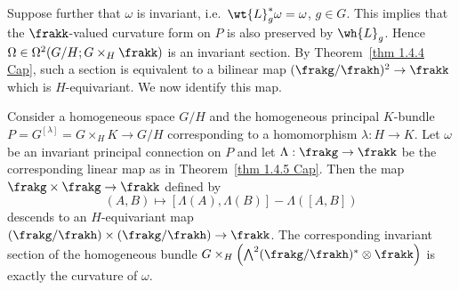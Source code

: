 Suppose further that $\omega$ is invariant, i.e.\ $\wt{L}_g^\ast \omega=\omega$, $g\in G$. This implies that the $\frakk$-valued curvature form on $P$ is also preserved by $\wh{L}_g$. Hence $\Omega\in\Omega^2(G\slash H;G\times_H \frakk)$ is an invariant section. By Theorem~\ref{thm 1.4.4 Cap}, such a section is equivalent to a bilinear map $(\frakg\slash\frakh)^2\to\frakk$ which is $H$-equivariant. We now identify this map.
\begin{prop}\label{prop 1.4.6 Cap}
    Consider a homogeneous space $G\slash H$ and the homogeneous principal $K$-bundle $P=G^{[\lambda]}=G\times_H K\to G\slash H$ corresponding to a homomorphism $\lambda:H\to K$. Let $\omega$ be an invariant principal connection on $P$ and let $\Lambda:\frakg\to \frakk$ be the corresponding linear map as in Theorem~\ref{thm 1.4.5 Cap}. Then the map $\frakg\times\frakg\to\frakk$ defined by 
    \[(A,B)\mapsto [\Lambda(A),\Lambda(B)]-\Lambda([A,B])\]
    descends to an $H$-equivariant map $(\frakg\slash\frakh)\times(\frakg\slash\frakh)\to \frakk$. The corresponding invariant section of the homogeneous bundle $G\times_H \left(\bigwedge^2(\frakg\slash\frakh)^\ast\otimes\frakk\right)$ is exactly the curvature of $\omega$.
\end{prop}
